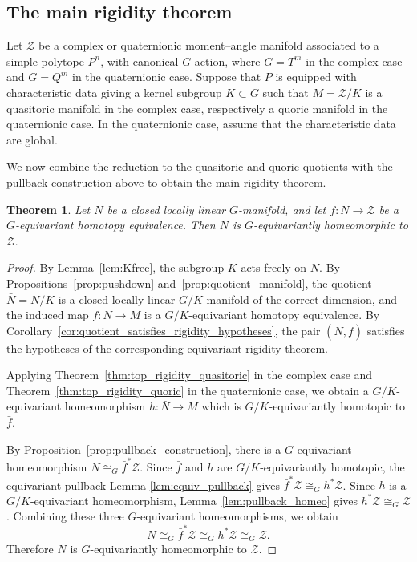 \documentclass[11pt,a4paper]{article}
\numberwithin{equation}{section}
\newtheorem{thm}[definition]{Theorem}
\theoremstyle{named}
\begin{document}
\subsection{The main rigidity theorem}

Let \(\mathcal Z\) be a complex or quaternionic moment--angle manifold associated to a simple polytope \(P^n\), with canonical \(G\)-action, where \(G=T^m\) in the complex case and \(G=Q^m\) in the quaternionic case. Suppose that \(P\) is equipped with characteristic data giving a kernel subgroup \(K\subset G \) such that \(M=\mathcal Z/K \) is a quasitoric manifold in the complex case, respectively a quoric manifold in the quaternionic case. In the quaternionic case, assume that the characteristic data are global.

We now combine the reduction to the quasitoric and quoric quotients with the pullback construction above to obtain the main rigidity theorem.

\begin{thm}
\label{thm:main_rigidity}
Let \(N\) be a closed locally linear \(G\)-manifold, and let \(f:N\longrightarrow \mathcal Z \) be a \(G\)-equivariant homotopy equivalence. Then \(N\) is \(G\)-equivariantly homeomorphic to \(\mathcal Z\).
\end{thm}

\begin{proof}
By Lemma~\ref{lem:Kfree}, the subgroup \(K\) acts freely on \(N\). By Propositions~\ref{prop:pushdown} and~\ref{prop:quotient_manifold}, the quotient \(\bar N=N/K\) is a closed locally linear \(G/K\)-manifold of the correct dimension, and the induced map \(\bar f:\bar N\longrightarrow M \) is a \(G/K\)-equivariant homotopy equivalence. By Corollary~\ref{cor:quotient_satisfies_rigidity_hypotheses}, the pair \((\bar N,\bar f)\) satisfies the hypotheses of the corresponding equivariant rigidity theorem.

Applying Theorem~\ref{thm:top_rigidity_quasitoric} in the complex case and Theorem~\ref{thm:top_rigidity_quoric} in the quaternionic case, we obtain a \(G/K\)-equivariant homeomorphism \(h:\bar N\longrightarrow M \) which is \(G/K\)-equivariantly homotopic to \(\bar f\).

By Proposition~\ref{prop:pullback_construction}, there is a \(G\)-equivariant homeomorphism \(N\cong_G \bar f^*\mathcal Z\). Since \(\bar f\) and \(h\) are \(G/K\)-equivariantly homotopic, the equivariant pullback Lemma \ref{lem:equiv_pullback} gives \(\bar f^*\mathcal Z\cong_G h^*\mathcal Z\). Since \(h\) is a \(G/K\)-equivariant homeomorphism, Lemma~\ref{lem:pullback_homeo} gives \(h^*\mathcal Z\cong_G \mathcal Z\). Combining these three \(G\)-equivariant homeomorphisms, we obtain
\[
    N
    \cong_G
    \bar f^*\mathcal Z
    \cong_G
    h^*\mathcal Z
    \cong_G
    \mathcal Z.
\]
Therefore \(N\) is \(G\)-equivariantly homeomorphic to \(\mathcal Z\).
\end{proof}
\end{document}
